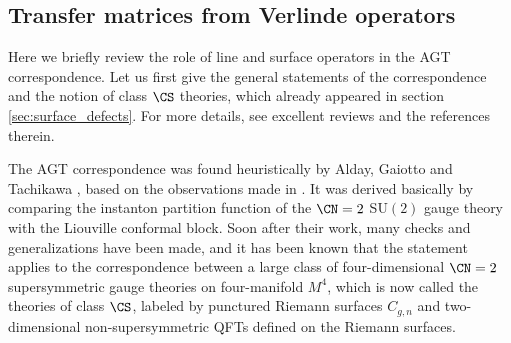 \subsection{Transfer matrices from Verlinde operators}
\label{sec:Toda}


Here we briefly review  the role of line and surface operators
in the AGT correspondence. Let us first give the general statements
of the correspondence and the notion of class $\CS$ theories,
which already appeared in section \ref{sec:surface_defects}.
For more details, see excellent reviews \cite{LeFloch:2020uop,Okuda:2014fja,Gukov:2014gja}
and the references therein.

The AGT correspondence was found heuristically by Alday,
Gaiotto and Tachikawa \cite{Alday:2009aq}, based on the observations
made in \cite{Gaiotto:2009we}. It was derived basically by comparing
the instanton partition function \cite{Nekrasov:2002qd} of the $\CN =2$ SU$(2)$
gauge theory with the Liouville conformal block.
Soon after their work, many checks and generalizations have been made, and
it has been known that the statement applies to the correspondence between a large class
 of four-dimensional $\CN = 2$ supersymmetric gauge theories on four-manifold $M^4$,
 which is now called the theories of class $\CS$, labeled by punctured Riemann
surfaces $C_{g,n}$ and two-dimensional non-supersymmetric QFTs defined on the Riemann surfaces.

